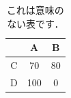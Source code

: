 \documentclass[dvipdfmx]{ampbt}
\def\numberofspines{1}
\begin{document}
  \begin{table}[htbp]
    \caption{これは意味のない表です．}
    \centering
    \begin{tabular}{c|cc}
        & A   & B  \\
      \hline
      C & 70  & 80 \\
      D & 100 & 0
    \end{tabular}
  \end{table}

\fi
\ifoutputcover
  \cleardoublepage
  \makecover                      %
  \makespine[\numberofspines]     %
\fi
\ifoutputabstractforsubmission
  \makeabstractforsubmission      %
\fi
\end{document}
